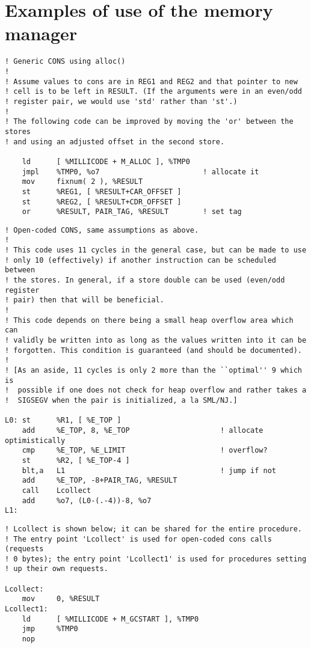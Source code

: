 \section{Examples of use of the memory manager}

\begin{verbatim}
! Generic CONS using alloc()
!
! Assume values to cons are in REG1 and REG2 and that pointer to new 
! cell is to be left in RESULT. (If the arguments were in an even/odd 
! register pair, we would use 'std' rather than 'st'.)
!
! The following code can be improved by moving the 'or' between the stores
! and using an adjusted offset in the second store.

    ld      [ %MILLICODE + M_ALLOC ], %TMP0    
    jmpl    %TMP0, %o7                        ! allocate it
    mov     fixnum( 2 ), %RESULT
    st      %REG1, [ %RESULT+CAR_OFFSET ]
    st      %REG2, [ %RESULT+CDR_OFFSET ]
    or      %RESULT, PAIR_TAG, %RESULT        ! set tag
\end{verbatim}

\begin{verbatim}
! Open-coded CONS, same assumptions as above.
!
! This code uses 11 cycles in the general case, but can be made to use
! only 10 (effectively) if another instruction can be scheduled between
! the stores. In general, if a store double can be used (even/odd register
! pair) then that will be beneficial.
!
! This code depends on there being a small heap overflow area which can
! validly be written into as long as the values written into it can be
! forgotten. This condition is guaranteed (and should be documented).
!
! [As an aside, 11 cycles is only 2 more than the ``optimal'' 9 which is
!  possible if one does not check for heap overflow and rather takes a 
!  SIGSEGV when the pair is initialized, a la SML/NJ.]

L0: st      %R1, [ %E_TOP ]
    add     %E_TOP, 8, %E_TOP                     ! allocate optimistically
    cmp     %E_TOP, %E_LIMIT                      ! overflow?
    st      %R2, [ %E_TOP-4 ]
    blt,a   L1                                    ! jump if not
    add     %E_TOP, -8+PAIR_TAG, %RESULT
    call    Lcollect
    add     %o7, (L0-(.-4))-8, %o7
L1:
\end{verbatim}

\begin{verbatim}
! Lcollect is shown below; it can be shared for the entire procedure.
! The entry point 'Lcollect' is used for open-coded cons calls (requests
! 0 bytes); the entry point 'Lcollect1' is used for procedures setting
! up their own requests.

Lcollect:
    mov     0, %RESULT
Lcollect1:
    ld      [ %MILLICODE + M_GCSTART ], %TMP0
    jmp     %TMP0
    nop
\end{verbatim}


